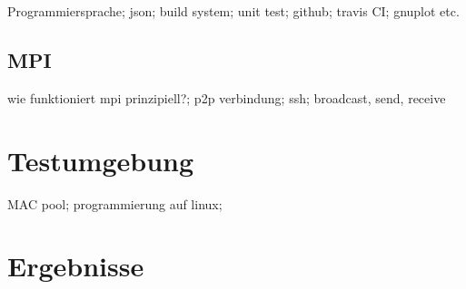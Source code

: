 \documentclass[12pt,a4paper]{scrreprt}
\begin{document}
Programmiersprache; json; build system; unit test; github; travis CI; gnuplot etc.

\section{MPI}
\label{sec:mpi}

wie funktioniert mpi prinzipiell?; p2p verbindung; ssh; broadcast, send, receive 

\chapter{Testumgebung}
\label{chap:testumgebung}

MAC pool; programmierung auf linux;

\chapter{Ergebnisse}
\label{chap:ergebnisse}

\clearpage
{}
\lstlistoflistings
{}
\listoffigures
\listoftables


\end{document}
